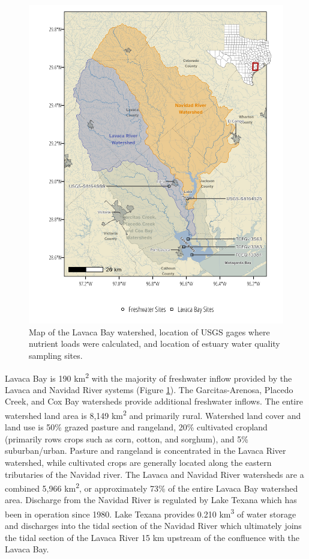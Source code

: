 \documentclass[water,article,submit,oneauthor]{Definitions/mdpi}
\begin{document}
\begin{figure}
\includegraphics[width=1\linewidth]{Schramm-Manuscript-2023_files/figure-latex/fig1-1.png}
\caption{Map of the Lavaca Bay watershed, location of USGS gages where nutrient loads were calculated, and location of estuary water quality sampling sites.\label{fig:fig1}}
\end{figure}  

Lavaca Bay is 190 km\textsuperscript{2} with the majority of freshwater
inflow provided by the Lavaca and Navidad River systems (Figure
\ref{fig:fig1}). The Garcitas-Arenosa, Placedo Creek, and Cox Bay
watersheds provide additional freshwater inflows. The entire watershed
land area is 8,149 km\textsuperscript{2} and primarily rural. Watershed
land cover and land use is 50\% grazed pasture and rangeland, 20\%
cultivated cropland (primarily rows crops such as corn, cotton, and
sorghum), and 5\% suburban/urban. Pasture and rangeland is concentrated
in the Lavaca River watershed, while cultivated crops are generally
located along the eastern tributaries of the Navidad river. The Lavaca
and Navidad River watersheds are a combined 5,966 km\textsuperscript{2},
or approximately 73\% of the entire Lavaca Bay watershed area. Discharge
from the Navidad River is regulated by Lake Texana which has been in
operation since 1980. Lake Texana provides 0.210 km\textsuperscript{3}
of water storage and discharges into the tidal section of the Navidad
River which ultimately joins the tidal section of the Lavaca River 15 km
upstream of the confluence with the Lavaca Bay.
\end{document}
